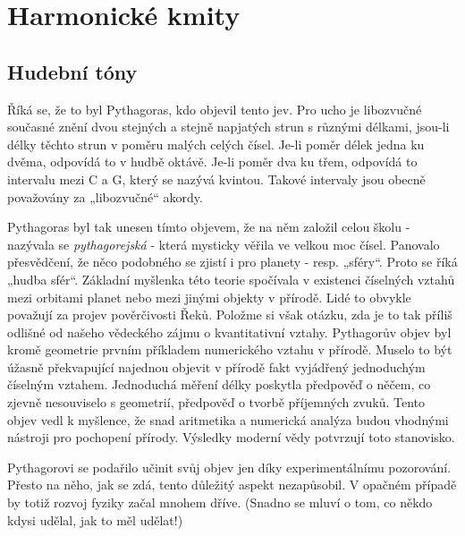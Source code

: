 \setchaptertoc
\chapter{Harmonické kmity}\label{fyz:IchapL}

\section{Hudební tóny}\label{fyz:IchapLsecI}
  Říká se, že to byl Pythagoras, kdo objevil tento jev. Pro ucho je libozvučné současné znění 
  dvou stejných a stejně napjatých strun s různými délkami, jsou-li délky těchto strun v poměru 
  malých celých čísel. Je-li poměr délek jedna ku dvěma, odpovídá to v hudbě oktávě. Je-li poměr 
  dva ku třem, odpovídá to intervalu mezi C a G, který se nazývá kvintou. Takové intervaly jsou 
  obecně považovány za „libozvučné“ akordy. 
  
  Pythagoras byl tak unesen tímto objevem, že na něm založil celou školu - nazývala se 
  \emph{pythagorejská} - která mysticky věřila ve velkou moc čísel. Panovalo přesvědčení, že něco 
  podobného se zjistí i pro planety - resp. „sféry“. Proto  se říká „hudba sfér“. Základní 
  myšlenka této teorie spočívala v existenci číselných vztahů mezi orbitami planet nebo mezi 
  jinými objekty v přírodě. Lidé to obvykle považují za projev pověrčivosti Řeků. Položme si však 
  otázku, zda je to tak příliš odlišné od našeho vědeckého zájmu o kvantitativní vztahy. 
  Pythagorův objev byl kromě geometrie prvním příkladem numerického vztahu v přírodě. Muselo to 
  být úžasně překvapující najednou objevit v přírodě fakt vyjádřený jednoduchým číselným vztahem. 
  Jednoduchá měření délky poskytla předpověď o něčem, co zjevně nesouviselo s geometrií,   
  předpověď o tvorbě příjemných zvuků. Tento objev vedl k myšlence, že snad aritmetika a   
  numerická analýza budou vhodnými nástroji pro pochopení přírody. Výsledky moderní vědy 
  potvrzují toto stanovisko.
   
  Pythagorovi se podařilo učinit svůj objev jen díky experimentálnímu pozorování. Přesto na něho, 
  jak se zdá, tento důležitý aspekt nezapůsobil. V opačném případě by totiž rozvoj fyziky začal 
  mnohem dříve. (Snadno se mluví o tom, co někdo kdysi udělal, jak to měl udělat!) 
    
